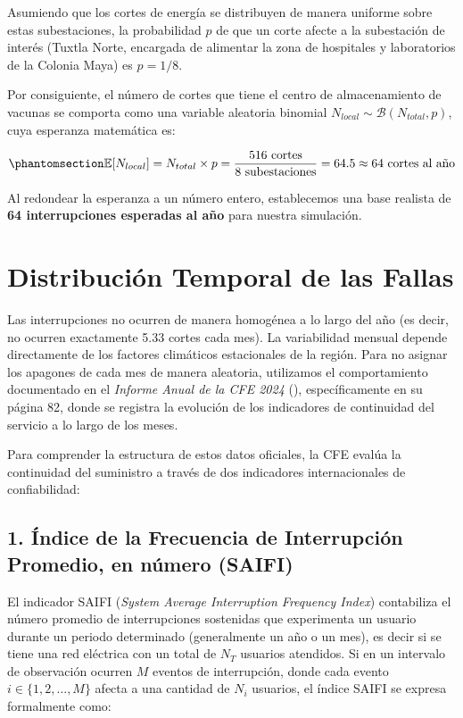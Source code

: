 \documentclass[
  spanish,
  us-letterpaper,
]{scrreprt}
\numberwithin{equation}{section}
\theoremstyle{plain}
\theoremstyle{plain}
\theoremstyle{plain}
\theoremstyle{definition}
\theoremstyle{remark}
\begin{document}
Asumiendo que los cortes de energía se distribuyen de manera uniforme
sobre estas subestaciones, la probabilidad \(p\) de que un corte afecte
a la subestación de interés (Tuxtla Norte, encargada de alimentar la
zona de hospitales y laboratorios de la Colonia Maya) es \(p = 1/8\).

Por consiguiente, el número de cortes que tiene el centro de
almacenamiento de vacunas se comporta como una variable aleatoria
binomial \(N_{local} \sim \mathcal{B}(N_{total}, p)\), cuya esperanza
matemática es:

\begin{equation}\phantomsection\label{eq-esperanza-local}{
\mathbb{E}[N_{local}] = N_{total} \times p = \frac{516 \text{ cortes}}{8 \text{ subestaciones}} = 64.5 \approx 64 \text{ cortes al año}
}\end{equation}

Al redondear la esperanza a un número entero, establecemos una base
realista de \textbf{64 interrupciones esperadas al año} para nuestra
simulación.

\section{Distribución Temporal de las
Fallas}\label{sec-distribucion-temporal}

Las interrupciones no ocurren de manera homogénea a lo largo del año (es
decir, no ocurren exactamente 5.33 cortes cada mes). La variabilidad
mensual depende directamente de los factores climáticos estacionales de
la región. Para no asignar los apagones de cada mes de manera aleatoria,
utilizamos el comportamiento documentado en el \emph{Informe Anual de la
CFE 2024} (), específicamente en su página 82, donde se registra
la evolución de los indicadores de continuidad del servicio a lo largo
de los meses.

Para comprender la estructura de estos datos oficiales, la CFE evalúa la
continuidad del suministro a través de dos indicadores internacionales
de confiabilidad:

\subsection{1. Índice de la Frecuencia de Interrupción Promedio, en
número
(SAIFI)}\label{uxedndice-de-la-frecuencia-de-interrupciuxf3n-promedio-en-nuxfamero-saifi}

El indicador SAIFI (\emph{System Average Interruption Frequency Index})
contabiliza el número promedio de interrupciones sostenidas que
experimenta un usuario durante un periodo determinado (generalmente un
año o un mes), es decir si se tiene una red eléctrica con un total de
\(N_T\) usuarios atendidos. Si en un intervalo de observación ocurren
\(M\) eventos de interrupción, donde cada evento
\(i \in \{1, 2, \dots, M\}\) afecta a una cantidad de \(N_i\) usuarios,
el índice SAIFI se expresa formalmente como:
\end{document}
